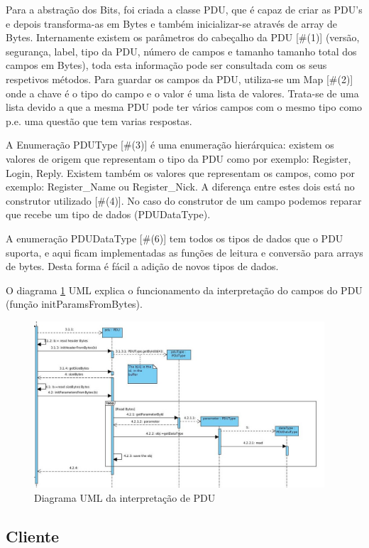 \documentclass[runningheads,a4paper]{llncs}
\begin{document}
Para a abstração dos Bits, foi criada a classe PDU, que é capaz de criar as PDU’s e depois transforma-as em Bytes e também inicializar-se através de array de Bytes.
Internamente existem os parâmetros do cabeçalho da PDU [\#(1)] (versão, segurança, label, tipo da PDU, número de campos e tamanho tamanho total dos campos em Bytes), toda esta informação pode ser consultada com os seus respetivos métodos.
Para guardar os campos da PDU, utiliza-se um Map [\#(2)] onde a chave é o tipo do campo e o valor é uma lista de valores. Trata-se de uma lista devido a que a mesma PDU pode ter vários campos com o mesmo tipo como p.e. uma questão que tem varias respostas.

A Enumeração PDUType [\#(3)] é uma enumeração hierárquica: existem os valores de origem que representam o tipo da PDU como por exemplo: Register, Login, Reply. Existem também os valores que representam os campos, como por exemplo: Register\_Name ou Register\_Nick.
A diferença entre estes dois está no construtor utilizado [\#(4)]. No caso do construtor de um campo podemos reparar que recebe um tipo de dados (PDUDataType).

A enumeração PDUDataType [\#(6)] tem todos os tipos de dados que o PDU suporta, e aqui ficam implementadas as funções de leitura e conversão para arrays de bytes.
Desta forma é fácil a adição de novos tipos de dados.

O diagrama \ref{fig:diagram-pdu} UML explica o funcionamento da interpretação do campos do PDU (função initParamsFromBytes).

\begin{figure}
\centering
\includegraphics[height=6.2cm]{PDU_interpretation.jpg}
\caption{Diagrama UML da interpretação de PDU}
\label{fig:diagram-pdu}
\end{figure}

\subsection{Cliente}
\end{document}
